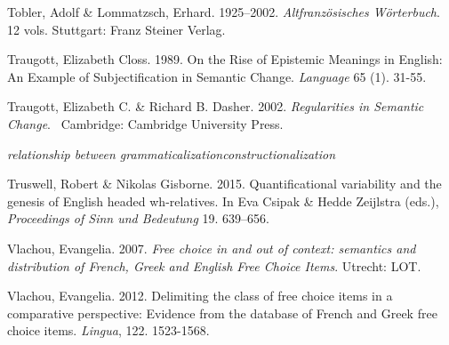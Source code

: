 \begin{styleStandard}
Tobler, Adolf \& Lommatzsch, Erhard. 1925–2002. \textit{Altfranzösisches Wörterbuch}. 12 vols. Stuttgart: Franz Steiner Verlag.
\end{styleStandard}

\begin{styleStandard}
Traugott, Elizabeth Closs. 1989. On the Rise of Epistemic Meanings in English: An Example of Subjectification in Semantic Change. \textit{Language} 65 (1). 31-55. 
\end{styleStandard}

\begin{styleStandard}
Traugott, Elizabeth C. \& Richard B. Dasher. 2002. \textit{Regularities in Semantic Change}. \ Cambridge: Cambridge University Press. 
\end{styleStandard}

\begin{styleannotationtext}
\emph{\textmd{relationship between grammaticalization}}\emph{\textmd{constructionalization}}
\end{styleannotationtext}

\begin{styleStandard}
Truswell, Robert \& Nikolas Gisborne. 2015. Quantificational variability and the genesis of English headed wh-relatives. In Eva Csipak \& Hedde Zeijlstra (eds.), \textit{Proceedings of Sinn und Bedeutung }19. 639–656.
\end{styleStandard}

\begin{styleStandard}
Vlachou, Evangelia. 2007. \textit{Free choice in and out of context: semantics and distribution of French, Greek and English Free Choice Items}. Utrecht: LOT. 
\end{styleStandard}

\begin{styleStandard}
Vlachou, Evangelia. 2012. Delimiting the class of free choice items in a comparative perspective: Evidence from the database of French and Greek free choice items. \textit{Lingua}, 122. 1523-1568.
\end{styleStandard}

